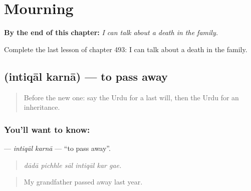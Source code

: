 
\chapter{Mourning}
\label{ch:ur-mourning}

\begin{chapteropening}
\textbf{By the end of this chapter:} \emph{I can talk about a death in the family.}

Complete the last lesson of chapter 493: I can talk about a death in the family.
\end{chapteropening}

\section[\texorpdfstring{\ur{انتقال} \ur{کرنا} (intiqāl karnā)}{انتقال کرنا (intiqāl karnā)}]{  (intiqāl karnā) — to pass away}

\label{lesson:UR-C493-intiqal-karna}



\begin{quote}
Before the new one: say the Urdu for a last will, then the Urdu for an inheritance.
\end{quote}

\subsection*{You'll want to know:  }
\textbf{ } — \emph{intiqāl karnā} — \textquotedblleft{}to pass away\textquotedblright{}.

\begin{quote}
     
\end{quote}

\begin{quote}
\emph{dādā pichhle sāl intiqāl kar gae.}
\end{quote}

\begin{quote}
My grandfather passed away last year.
\end{quote}

